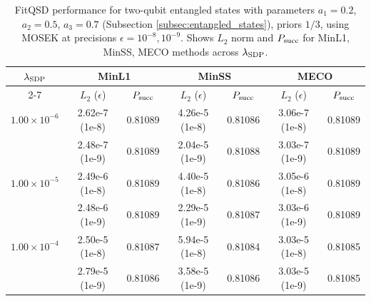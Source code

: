 \begin{table}[ht]
    \centering
    \caption{FitQSD performance for two-qubit entangled states with parameters $a_1 = 0.2$, $a_2 = 0.5$, $a_3 = 0.7$ (Subsection \ref{subsec:entangled_states}), priors $1/3$, using MOSEK at precisions $\epsilon = 10^{-8}, 10^{-9}$. Shows $L_2$ norm and $P_{\mathrm{succ}}$ for MinL1, MinSS, MECO methods across $\lambda_{\mathrm{SDP}}$.}
    \label{tab:fitqsd_results}
    \begin{tabular}{c c c c c c c}
        \hline
        \textbf{$\lambda_{\mathrm{SDP}}$} & \multicolumn{2}{c}{\textbf{MinL1}} & \multicolumn{2}{c}{\textbf{MinSS}} & \multicolumn{2}{c}{\textbf{MECO}}                                                                                         \\
        \cline{2-7}
                                        & \textbf{$L_2$} ($\epsilon$)        & \textbf{$P_{\mathrm{succ}}$}         & \textbf{$L_2$} ($\epsilon$)       & \textbf{$P_{\mathrm{succ}}$} & \textbf{$L_2$} ($\epsilon$) & \textbf{$P_{\mathrm{succ}}$} \\
        \hline
        $1.00 \times 10^{-6}$           & 2.62e-7 (1e-8)                     & 0.81089                            & 4.26e-5 (1e-8)                    & 0.81086                    & 3.06e-7 (1e-8)              & 0.81089                    \\
                                        & 2.48e-7 (1e-9)                     & 0.81089                            & 2.04e-5 (1e-9)                    & 0.81088                    & 3.03e-7 (1e-9)              & 0.81089                    \\
        $1.00 \times 10^{-5}$           & 2.49e-6 (1e-8)                     & 0.81089                            & 4.40e-5 (1e-8)                    & 0.81086                    & 3.05e-6 (1e-8)              & 0.81089                    \\
                                        & 2.48e-6 (1e-9)                     & 0.81089                            & 2.29e-5 (1e-9)                    & 0.81087                    & 3.03e-6 (1e-9)              & 0.81089                    \\
        $1.00 \times 10^{-4}$           & 2.50e-5 (1e-8)                     & 0.81087                            & 5.94e-5 (1e-8)                    & 0.81084                    & 3.03e-5 (1e-8)              & 0.81085                    \\
                                        & 2.79e-5 (1e-9)                     & 0.81086                            & 3.58e-5 (1e-9)                    & 0.81086                    & 3.03e-5 (1e-9)              & 0.81085                    \\

\end{tabular}
\end{table}
